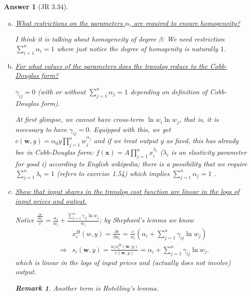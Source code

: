 \documentclass{article}
\newtheorem*{ans}{Answer}
\newtheorem{rem}{\bf Remark}
\newcommand{\1}{{\bf 1}}
\newcommand{\0}{{\mathbf{0}}}
\newcommand{\w}{{\mathbf{w}}}
\newcommand{\x}{{\mathbf{x}}}
\newcommand{\<}{\langle}
\renewcommand{\>}{\rangle}
\begin{document}
\begin{ans}[JR 3.34] \begin{enumerate}[(a)]
		\item \ul{What restrictions on the parameters $\alpha_i$ are required to ensure homogeneity?} 
		
		I think it is talking about homogeneity of degree $\beta$:
We need restriction $\sum_{i=1}^n \alpha_i = 1$ 
		where just notice the degree of homogenity is naturally
	 $1$.
		\item \ul{For what values of the parameters does the translog reduce to the Cobb-Douglas form?}
		
		 $\gamma_{ij}=0$ (with or without $\sum_{j =1 }^n \alpha_j=1$ depending on definition of Cobb-Douglas form).
		
At first glimpse, we cannot have cross-term $\ln w_i \ln w_j$, that is, it is necessary to have $\gamma_{ij}=0$. Equipped with this, we get $c(\w,y) = \alpha _0 y \prod_{j = 1}^n w_j^{\alpha_j}$ and if we treat output $y$ as fixed, this has already bee in Cobb-Douglas form: $f(\x) = A\prod_{j =1}^n x_i^{\lambda_i}$ ($\lambda_i$ is an elasticity parameter for good i) according to English wikipedia; there is a possibility that we require $\sum_{j=1}^n \lambda_i = 1$ (refers to exercise 1.54) which implies $\sum_{j =1 }^n \alpha_j=1$ .
		\item \ul{Show that input shares in the translog cost function are linear in the logs of input prices and output.} 
		
		Notice $\frac{ \frac{\partial c}{ \partial w_i } }{c} = \frac{\alpha_i}{w_i } + \frac{\sum_{j=1}^n \gamma_{ij}  \ln w_j }{w_i}$; by Shephard's lemma we know 
\begin{eqnarray*}
&&  x^H_i (w,y)= \frac{\partial c}{ \partial w_i } = \frac{c}{w_i}  \left(\alpha_i + \sum_{j=1}^n \gamma_{ij}  \ln w_j \right)\\
& \Rightarrow & s_i (\w,y) = \frac{w_i x^H_i(\w,y)}{c(\w,y)} =\alpha_i + \sum_{j=1}^n \gamma_{ij}  \ln w_j.
\end{eqnarray*}
which is linear in the logs of input prices and (actually does not involve) output.

\begin{rem}
	Another term is Hotelling's lemma.
\end{rem}
	\end{enumerate}
\end{ans}
\end{document}
